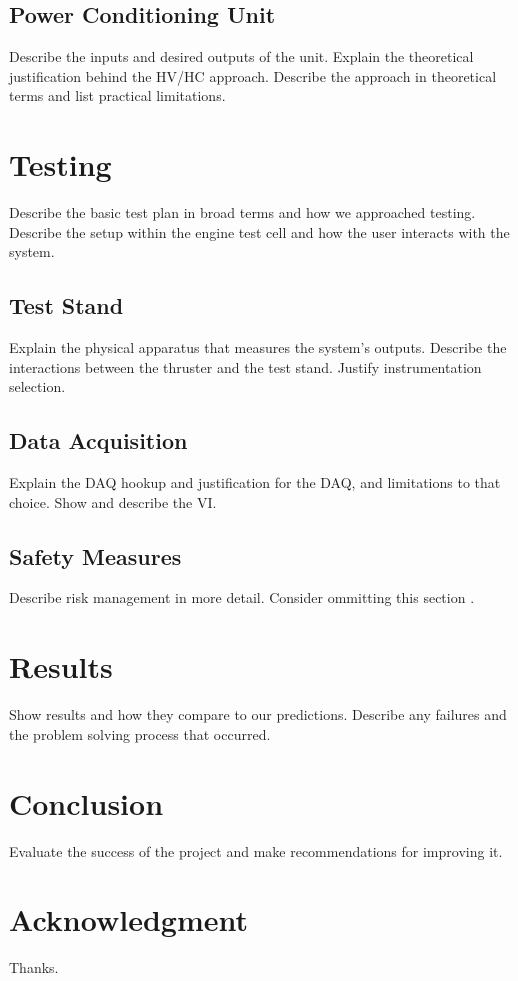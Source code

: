 \documentclass[journal]{IEEEtran}
\begin{document}
\subsection{Power Conditioning Unit}
Describe the inputs and desired outputs of the unit. Explain the theoretical justification behind the HV/HC approach. Describe the approach in theoretical terms and list practical limitations.

\section{Testing}
Describe the basic test plan in broad terms and how we approached testing. Describe the setup within the engine test cell and how the user interacts with the system.

\subsection{Test Stand}
Explain the physical apparatus that measures the system's outputs. Describe the interactions between the thruster and the test stand. Justify instrumentation selection.

\subsection{Data Acquisition}
Explain the DAQ hookup and justification for the DAQ, and limitations to that choice. Show and describe the VI.

\subsection{Safety Measures}
Describe risk management in more detail. Consider ommitting this section \cite{linden}.

\section{Results}
Show results and how they compare to our predictions. Describe any failures and the problem solving process that occurred.

\section{Conclusion}
Evaluate the success of the project and make recommendations for improving it.

\section*{Acknowledgment}
Thanks.



\end{document}
